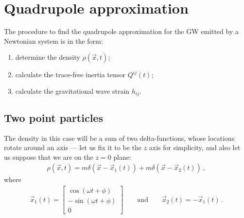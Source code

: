 \documentclass[main.tex]{subfiles}
\begin{document}
\section{Quadrupole approximation}

The procedure to find the quadrupole approximation 
for the GW emitted by a Newtonian system is in the form: 
\begin{enumerate}
    \item determine the density \(\rho (\vec{x}, t)\);
    \item calculate the trace-free inertia tensor \(Q^{ij}(t)\);
    \item calculate the gravitational wave strain \(h_{ij}\). 
\end{enumerate}

\subsection{Two point particles}

The density in this case will be a sum of two delta-functions,
whose locations rotate around an axis --- let us fix it to be
the \(z\) axis for simplicity, 
and also let us suppose that we are on the \(z = 0 \) plane: 
%
\begin{align}
\rho (\vec{x}, t) = m\delta (\vec{x} - \vec{x}_1(t)) + m\delta (\vec{x} - \vec{x}_2 (t))
\,,
\end{align}
%
where 
%
\begin{align}
\vec{x}_1 (t) = \left[\begin{array}{c}
\cos(\omega t + \phi ) \\ 
- \sin(\omega t + \phi ) \\ 
0
\end{array}\right]
\qquad \text{and} \qquad
\vec{x}_2 (t) = - \vec{x}_1 (t)
\,.
\end{align}
%
\end{document}
